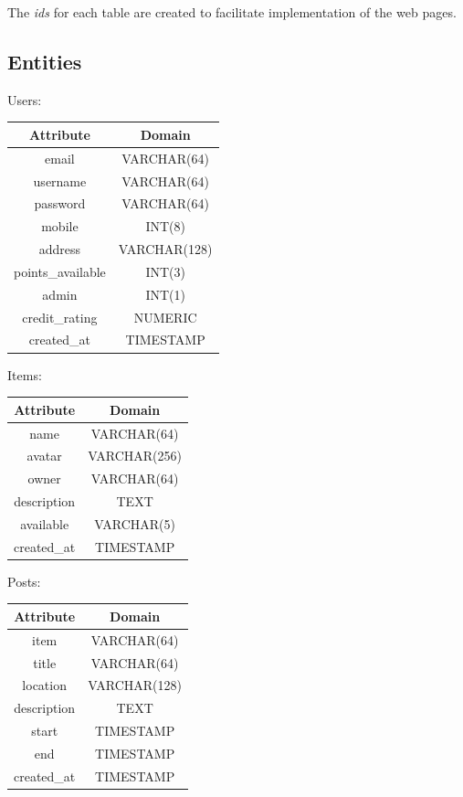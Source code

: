 The \textit{ids} for each table are created to facilitate implementation of the web pages.

\newpage

\subsection{Entities}

\begin{center}
Users: \quad
\begin{tabular}{|c|c|}
\hline
Attribute & Domain\\
\hline
email & VARCHAR(64)\\
username & VARCHAR(64) \\
password & VARCHAR(64) \\
mobile & INT(8) \\
address & VARCHAR(128) \\
points\_available & INT(3) \\
admin & INT(1) \\
credit\_rating & NUMERIC \\
created\_at & TIMESTAMP \\
\hline
\end{tabular}
\end{center}

\begin{center}
Items: \quad
\begin{tabular}{|c|c|}
\hline
Attribute & Domain\\
\hline
name & VARCHAR(64)\\
avatar & VARCHAR(256) \\
owner & VARCHAR(64) \\
description & TEXT \\
available & VARCHAR(5)\\
created\_at & TIMESTAMP \\
\hline
\end{tabular}
\end{center}

\begin{center}
Posts: \quad
\begin{tabular}{|c|c|}
\hline
Attribute & Domain\\
\hline
item & VARCHAR(64)\\
title & VARCHAR(64) \\
location & VARCHAR(128) \\
description & TEXT \\
start & TIMESTAMP \\
end & TIMESTAMP \\
created\_at & TIMESTAMP \\
\hline
\end{tabular}
\end{center}

